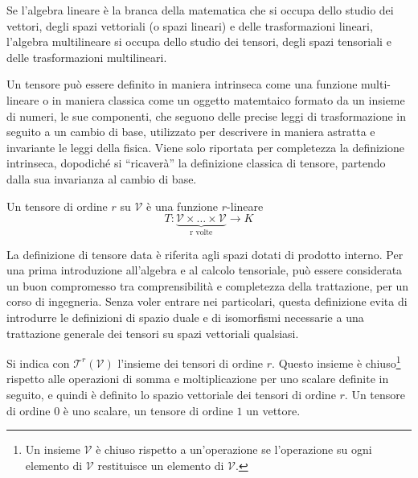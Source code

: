 Se l'algebra lineare è la branca della matematica che si occupa dello studio dei vettori, degli spazi vettoriali (o spazi lineari) e delle trasformazioni lineari, l'algebra multilineare si occupa dello studio dei tensori, degli spazi tensoriali e delle trasformazioni multilineari.

Un tensore può essere definito in maniera intrinseca come una funzione multi-lineare o in maniera classica come un oggetto matemtaico formato da un insieme di numeri, le sue componenti, che seguono delle precise leggi di trasformazione in seguito a un cambio di base, utilizzato per descrivere in maniera astratta e invariante le leggi della fisica.
Viene solo riportata per completezza la definizione intrinseca, dopodiché si ``ricaverà'' la definizione classica di tensore, partendo dalla sua invarianza al cambio di base. 
\begin{definition}\label{def:tensIntrinseca}
 Un tensore di ordine $r$ su $\mathcal{V}$ è una funzione
 $r$-lineare
\begin{equation}
   T : \underbrace{\mathcal{V}   \times \dots \times \mathcal{V}  }_{\text{r volte}} \rightarrow K
\end{equation}
%
\begin{remark}
 La definizione di tensore data è riferita agli spazi dotati di prodotto interno. Per una prima introduzione all'algebra e al calcolo tensoriale, può essere considerata un buon compromesso tra comprensibilità e completezza della trattazione, per un corso di ingegneria. Senza voler entrare nei particolari, questa definizione evita di introdurre le definizioni di spazio duale e di isomorfismi necessarie a una trattazione generale dei tensori su spazi vettoriali qualsiasi.
\end{remark}
%
  Si indica con $\mathcal{T}^r(\mathcal{V})$ l'insieme dei tensori di ordine $r$. Questo insieme è chiuso\footnote{Un insieme $\mathcal{V}$ è chiuso rispetto a un'operazione se l'operazione su ogni elemento di $\mathcal{V}$ restituisce un elemento di $\mathcal{V}$.} rispetto alle operazioni di somma e moltiplicazione per uno scalare definite in seguito, e quindi è definito lo spazio vettoriale dei tensori di ordine $r$. %
 Un tensore di ordine $0$ è uno scalare, un tensore di ordine $1$ un vettore.
\end{definition}



